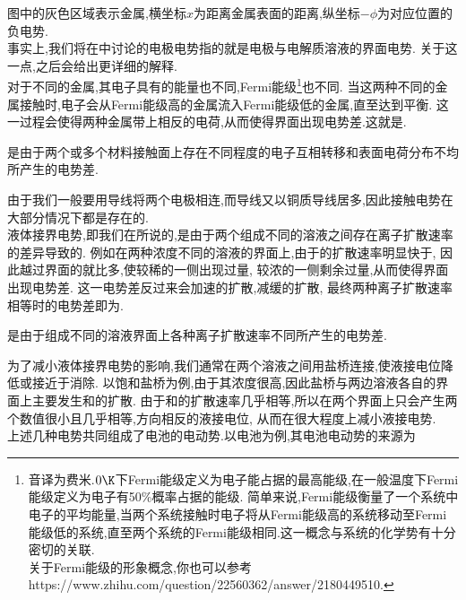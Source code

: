 \documentclass{ctexart}
\begin{document}
图中的灰色区域表示金属,横坐标$x$为距离金属表面的距离,纵坐标$-\phi$为对应位置的负电势.\\
\indent 事实上,我们将在中讨论的电极电势指的就是电极与电解质溶液的界面电势.%
关于这一点,之后会给出更详细的解释.\vspace{4pt}\\
\indent 对于不同的金属,其电子具有的能量也不同,Fermi能级\footnote{音译为费米.$0\K$下Fermi能级定义为电子能占据的最高能级,在一般温度下Fermi能级定义为电子有50\%概率占据的能级.%
简单来说,Fermi能级衡量了一个系统中电子的平均能量,当两个系统接触时电子将从Fermi能级高的系统移动至Fermi能级低的系统,直至两个系统的Fermi能级相同.这一概念与系统的化学势有十分密切的关联.\\
\indent 关于Fermi能级的形象概念,你也可以参考https://www.zhihu.com/question/22560362/answer/2180449510.}也不同.%
当这两种不同的金属接触时,电子会从Fermi能级高的金属流入Fermi能级低的金属,直至达到平衡.%
这一过程会使得两种金属带上相反的电荷,从而使得界面出现电势差.这就是.
\begin{definition}[6B.3.2 接触电势]
    是由于两个或多个材料接触面上存在不同程度的电子互相转移和表面电荷分布不均所产生的电势差.
\end{definition}
由于我们一般要用导线将两个电极相连,而导线又以铜质导线居多,因此接触电势在大部分情况下都是存在的.\vspace{4pt}\\
\indent 液体接界电势,即我们在所说的,是由于两个组成不同的溶液之间存在离子扩散速率的差异导致的.%
例如在两种浓度不同的溶液的界面上,由于的扩散速率明显快于,%
因此越过界面的就比多,使较稀的一侧出现过量,%
较浓的一侧剩余过量,从而使得界面出现电势差.%
这一电势差反过来会加速的扩散,减缓的扩散,%
最终两种离子扩散速率相等时的电势差即为.
\begin{definition}[6B.3.2 液体接界电势]
    是由于组成不同的溶液界面上各种离子扩散速率不同所产生的电势差.
\end{definition}
为了减小液体接界电势的影响,我们通常在两个溶液之间用盐桥连接,使液接电位降低或接近于消除.%
以饱和盐桥为例,由于其浓度很高,因此盐桥与两边溶液各自的界面上主要发生和的扩散.%
由于和的扩散速率几乎相等,所以在两个界面上只会产生两个数值很小且几乎相等,方向相反的液接电位,%
从而在很大程度上减小液接电势.\vspace{4pt}\\
\indent 上述几种电势共同组成了电池的电动势.以电池为例,其电池电动势的来源为
\end{document}
